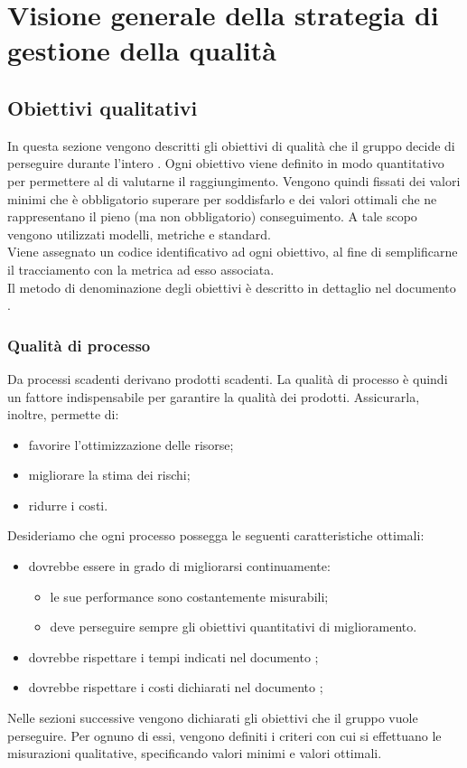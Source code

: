 \documentclass[PianoDiQualifica.tex]{subfiles}
\begin{document}
\section{Visione generale della strategia di gestione della qualità}
	\subsection{Obiettivi qualitativi}
		In questa sezione vengono descritti gli obiettivi di qualità che il gruppo \GRUPPO{} decide di perseguire durante l'intero .
		Ogni obiettivo viene definito in modo quantitativo per permettere al  di valutarne il raggiungimento.
		Vengono quindi fissati dei valori minimi che è obbligatorio superare per soddisfarlo e dei valori ottimali che ne rappresentano il pieno (ma non obbligatorio) conseguimento.
		A tale scopo vengono utilizzati modelli, metriche e standard. \\
		Viene assegnato un codice identificativo ad ogni obiettivo, al fine di semplificarne il tracciamento con la metrica ad esso associata. \\
		Il metodo di denominazione degli obiettivi è descritto in dettaglio nel documento \NPdoc{}.

		\subsubsection{Qualità di processo}
		Da processi scadenti derivano prodotti scadenti. La qualità di processo è quindi un fattore indispensabile per garantire la qualità dei prodotti. Assicurarla, inoltre, permette di:
		\begin{itemize}
			\item favorire l'ottimizzazione delle risorse;
			\item migliorare la stima dei rischi;
			\item ridurre i costi.
		\end{itemize}
		Desideriamo che ogni processo possegga le seguenti caratteristiche ottimali:
		\begin{itemize}
			\item dovrebbe essere in grado di migliorarsi continuamente:
			\begin{itemize}
					\item le sue performance sono costantemente misurabili;
					\item deve perseguire sempre gli obiettivi quantitativi di miglioramento.
			\end{itemize}
			\item dovrebbe rispettare i tempi indicati nel documento \PPdoc;
			\item dovrebbe rispettare i costi dichiarati nel documento \PPdoc;
		\end{itemize}
		Nelle sezioni successive vengono dichiarati gli obiettivi che il gruppo vuole perseguire. Per ognuno di essi, vengono definiti i criteri con cui si effettuano le misurazioni qualitative,
		specificando valori minimi e valori ottimali.
\end{document}
